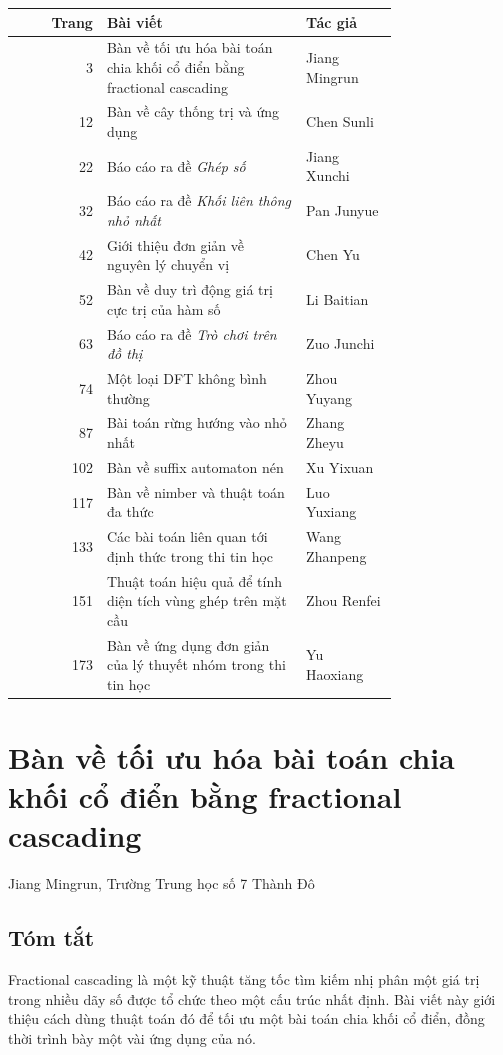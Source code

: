\documentclass[11pt]{article}
\begin{document}
\begin{center}
\small
\begin{tabular}{r p{0.52\linewidth} p{0.24\linewidth}}
\textbf{Trang} & \textbf{Bài viết} & \textbf{Tác giả} \\
\hline
3 & Bàn về tối ưu hóa bài toán chia khối cổ điển bằng fractional cascading & Jiang Mingrun \\
12 & Bàn về cây thống trị và ứng dụng & Chen Sunli \\
22 & Báo cáo ra đề \emph{Ghép số} & Jiang Xunchi \\
32 & Báo cáo ra đề \emph{Khối liên thông nhỏ nhất} & Pan Junyue \\
42 & Giới thiệu đơn giản về nguyên lý chuyển vị & Chen Yu \\
52 & Bàn về duy trì động giá trị cực trị của hàm số & Li Baitian \\
63 & Báo cáo ra đề \emph{Trò chơi trên đồ thị} & Zuo Junchi \\
74 & Một loại DFT không bình thường & Zhou Yuyang \\
87 & Bài toán rừng hướng vào nhỏ nhất & Zhang Zheyu \\
102 & Bàn về suffix automaton nén & Xu Yixuan \\
117 & Bàn về nimber và thuật toán đa thức & Luo Yuxiang \\
133 & Các bài toán liên quan tới định thức trong thi tin học & Wang Zhanpeng \\
151 & Thuật toán hiệu quả để tính diện tích vùng ghép trên mặt cầu & Zhou Renfei \\
173 & Bàn về ứng dụng đơn giản của lý thuyết nhóm trong thi tin học & Yu Haoxiang \\
\end{tabular}
\end{center}

\section{Bàn về tối ưu hóa bài toán chia khối cổ điển bằng fractional cascading}

\begin{center}
Jiang Mingrun, Trường Trung học số 7 Thành Đô
\end{center}

\subsection*{Tóm tắt}

Fractional cascading là một kỹ thuật tăng tốc tìm kiếm nhị phân một giá trị
trong nhiều dãy số được tổ chức theo một cấu trúc nhất định. Bài viết này giới
thiệu cách dùng thuật toán đó để tối ưu một bài toán chia khối cổ điển, đồng
thời trình bày một vài ứng dụng của nó.
\end{document}
